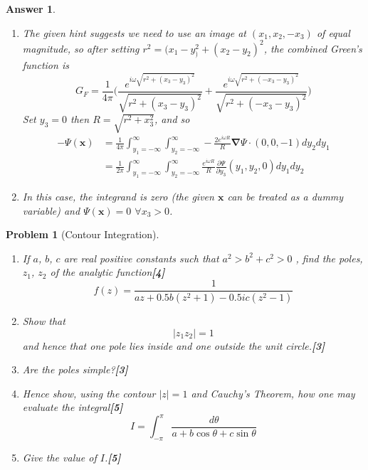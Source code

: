 \documentclass[a4paper]{article}
\newtheorem{ans}{Answer}[section]
\theoremstyle{new}
\newtheorem{qns}{Problem}[section]
\begin{document}
\begin{ans}
\begin{enumerate}[label=(\roman*)]
\item The given hint suggests we need to use an image at $(x_1,x_2,-x_3)$ of equal magnitude, so after setting $r^2=(x_1-y_)^2+(x_2-y_2)^2$, the combined Green's function is
$$G_F=\frac{1}{4\pi}\bigg(\frac{e^{i\omega\sqrt{r^2+(x_3-y_3)^2}}}{\sqrt{r^2+(x_3-y_3)^2}}+\frac{e^{i\omega\sqrt{r^2+(-x_3-y_3)^2}}}{\sqrt{r^2+(-x_3-y_3)^2}}\bigg)$$
Set $y_3=0$ then $R=\sqrt{r^2+x_3^2}$, and so 
\begin{align}
-\Psi(\mathbf{x})&=\frac{1}{4\pi}\int_{y_1=-\infty}^\infty\int_{y_2=-\infty}^\infty -\frac{2e^{i\omega R}}{R}\boldsymbol{\nabla}\Psi\cdot (0,0,-1)dy_2dy_1\nonumber\\&=\frac{1}{2\pi}\int_{y_1=-\infty}^\infty\int_{y_2=-\infty}^\infty\frac{e^{i\omega R}}{R}\frac{\partial\Psi}{\partial y_3}(y_1,y_2,0)dy_1dy_2\nonumber
\end{align}
\item In this case, the integrand is zero (the given $\mathbf{x}$ can be treated as a dummy variable) and $\Psi(\mathbf{x})=0$ $\forall x_3>0$.
\end{enumerate}
\end{ans}
\newpage
\begin{qns}[Contour Integration]\leavevmode
\begin{enumerate}[label=(\roman*)]
    \item If $a$, $b$, $c$ are real positive constants such that $a^2 > b^2 + c^2 > 0$ , find the poles, $z_1$, $z_2$ of the analytic function\hfill\textbf{[4]}
$$f(z)=\frac{1}{az+0.5b(z^2+1)-0.5ic(z^2-1)}$$
\item Show that $$|z_1z_2|=1$$
and hence that one pole lies inside and one outside the unit circle.\hfill\textbf{[3]}
\item Are the poles simple?\hfill\textbf{[3]}
\item Hence show, using the contour $|z| = 1$ and Cauchy’s Theorem, how one may evaluate the integral\hfill\textbf{[5]}
$$I=\int_{-\pi}^\pi\frac{d\theta}{a+b\cos\theta+c\sin\theta}$$
\item Give the value of $I$.\hfill\textbf{[5]}
\end{enumerate}
\end{qns}
\end{document}
